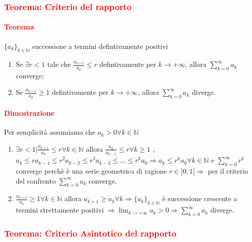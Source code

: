 \documentclass{article}
\newcommand{\N}{\mathbb{N}}
\begin{document}
\subsubsection{\textcolor{red}{Teorema: Criterio del rapporto}}
\paragraph{\textcolor{red}{Teorema}}
$\{a_k \}_{k \in \N}$ successione a termini defintivamente positivi 
\begin{enumerate}
    \item Se $\exists r< 1 $ tale che $\frac{a_{k+1}}{a_k} \leq r$ defintivamente per $ k \rightarrow +\infty$, allora $\sum_{k=0}^{\infty} a_k $ converge;
    \item Se $\frac{a_{k+1}}{a_k} \geq 1$ defintivamente per $ k\rightarrow +\infty$, allora $\sum_{k=0}^{\infty} a_k $ diverge.
\end{enumerate}

\paragraph{\textcolor{red}{Dimostrazione}}
Per semplicità assumiamo che $a_k > 0 \forall k \in \N$
\begin{enumerate}
    \item $\exists r < 1 | \frac{a_{k+1}}{a_k} \leq r \forall k \in \N$ allora $\frac{a_k}{a_{k-1}} \leq r \forall k \geq 1$ , $ a_k \leq ra_{k-1} \leq r^2 a_{k-2} \leq r^3 a_{k-3} \leq ... \leq r^k a_0 \Rightarrow a_k \leq r^k a_0 \forall k \in \N$ e $\sum_{k=0}^{\infty} r^k$ converge perchè è una serie geometrica di ragione $ r \in ]0,1[ \Rightarrow$ per il criterio del confronto $\sum_{k=0}^{\infty} a_k$ converge.
    
    \item $\frac{a_{k+1}}{a_k} \geq 1 \forall k \in \N$ allora $a_{k+1} \geq a_k \forall k \Rightarrow \{ a_k\}_{k \in \N}$ è successione crescente a termini strettamente positivi $\Rightarrow\lim_{k \rightarrow+\infty} a_k > 0 \Rightarrow \sum_{k=0}^{\infty} a_k$ diverge.   
\end{enumerate}
\begin{flushright}
\large\Lightning
\end{flushright}

\subsubsection{\textcolor{red}{Teorema: Criterio Asintotico del rapporto}}
\end{document}
